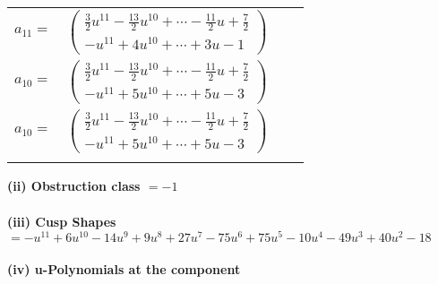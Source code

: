 \documentclass[1p]{elsarticle_modified}
\theoremstyle{definition}
\begin{document}
\begin{tabular}{m{7pt} m{180pt} m{7pt} m{180pt} }
\flushright $a_{11}=$&$\begin{pmatrix}\frac{3}{2} u^{11}-\frac{13}{2} u^{10}+\cdots-\frac{11}{2} u+\frac{7}{2}\\- u^{11}+4 u^{10}+\cdots+3 u-1\end{pmatrix}$ \\
\flushright $a_{10}=$&$\begin{pmatrix}\frac{3}{2} u^{11}-\frac{13}{2} u^{10}+\cdots-\frac{11}{2} u+\frac{7}{2}\\- u^{11}+5 u^{10}+\cdots+5 u-3\end{pmatrix}$\\ \flushright $a_{10}=$&$\begin{pmatrix}\frac{3}{2} u^{11}-\frac{13}{2} u^{10}+\cdots-\frac{11}{2} u+\frac{7}{2}\\- u^{11}+5 u^{10}+\cdots+5 u-3\end{pmatrix}$\\&\end{tabular}
\flushleft \textbf{(ii) Obstruction class $= -1$}\\~\\
\flushleft \textbf{(iii) Cusp Shapes $= - u^{11}+6 u^{10}-14 u^9+9 u^8+27 u^7-75 u^6+75 u^5-10 u^4-49 u^3+40 u^2-18$}\\~\\
\newpage\renewcommand{\arraystretch}{1}
\flushleft \textbf{(iv) u-Polynomials at the component}\newline \\
\end{document}

